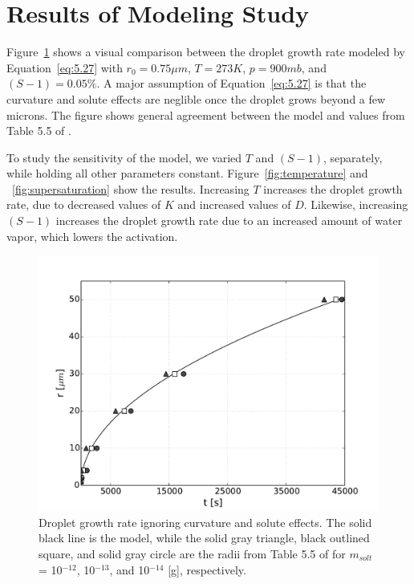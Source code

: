 \documentclass[]{article}
\begin{document}
\section{Results of Modeling Study}
Figure~\ref{fig:r_t} shows a visual comparison between the droplet growth rate
modeled by Equation~\eqref{eq:5.27} with $r_0 = 0.75 \mu m$, $T=273 K$, $p=900
mb$, and $(S - 1) = 0.05\%$. A major assumption of Equation~\ref{eq:5.27} is that
the curvature and solute effects are neglible once the droplet grows beyond a
few microns. The figure shows general agreement between the model and values
from Table 5.5 of \cite{Curry}.

To study the sensitivity of the model, we varied $T$ and $(S - 1)$, separately,
while holding all other parameters constant. Figure~\ref{fig:temperature} and
~\ref{fig:supersaturation} show the results. Increasing $T$ increases the
droplet growth rate, due to decreased values of $K$ and increased values of
$D$.  Likewise, increasing $(S - 1)$ increases the droplet growth rate due to
an increased amount of water vapor, which lowers the activation.

\begin{figure}\label{fig:r_t}
    \centering
    \includegraphics[width=\textwidth]{r_t.pdf}
    \caption{Droplet growth rate ignoring curvature and solute effects. The solid black line is the model, while the solid gray triangle, black outlined square, and solid gray circle are the radii from Table 5.5 of \cite{Curry} for $m_{solt}$ = 10$^{-12}$, 10$^{-13}$, and 10$^{-14}$ [g], respectively.}
\end{figure}
\end{document}
